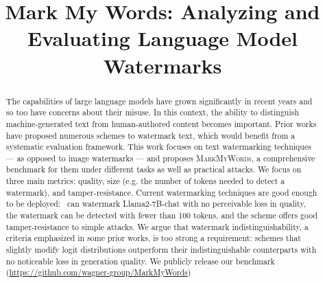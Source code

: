 \documentclass[conference,compsoc,10pt]{IEEEtran}
\title{Mark My Words: Analyzing and Evaluating Language Model Watermarks}
\author{\IEEEauthorblockN{Julien Piet}
\IEEEauthorblockA{\textit{UC Berkeley} }
\and
\IEEEauthorblockN{Chawin Sitawarin}
\IEEEauthorblockA{\textit{UC Berkeley} }
\and
\IEEEauthorblockN{Vivian Fang}
\IEEEauthorblockA{\textit{UC Berkeley} }
\and

\IEEEauthorblockN{Norman Mu}
\IEEEauthorblockA{\textit{UC Berkeley} }
\and
\IEEEauthorblockN{David Wagner}
\IEEEauthorblockA{\textit{UC Berkeley} }
}
\newcommand{\benchmarkname}{\textsc{MarkMyWords}}
\newcommand{\mylink}[1]{\url{#1}}
\begin{document}
\maketitle
\thispagestyle{plain}
\pagestyle{plain}


\begin{abstract}
  The capabilities of large language models have grown significantly in recent years and so too have concerns about their misuse. 
  In this context, the ability to distinguish machine-generated text from human-authored content becomes important. 
  Prior works have proposed numerous schemes to watermark text, which would benefit from a systematic evaluation framework.
  This work focuses on text watermarking techniques --- as opposed to image watermarks --- and proposes \benchmarkname{}, a 
  comprehensive benchmark for them under different tasks 
  as well as practical attacks. We focus on three main metrics: quality, size (e.g. the number of tokens needed to detect a watermark), and tamper-resistance. 
  Current watermarking techniques are good enough to be deployed:~\citet{kirchenbauer_watermark_2023} can 
  watermark Llama2-7B-chat with no perceivable loss in quality, the watermark can be detected with fewer than 100 tokens, and the scheme offers good tamper-resistance to simple attacks. 
  We argue that watermark indistinguishability, a criteria emphasized in some prior works, is too strong a requirement: schemes that slightly modify logit 
  distributions outperform their indistinguishable counterparts with no noticeable loss in generation quality. 
  We publicly release our benchmark (\mylink{https://github.com/wagner-group/MarkMyWords})
\end{abstract}











% 

\newpage

\appendix



\end{document}
